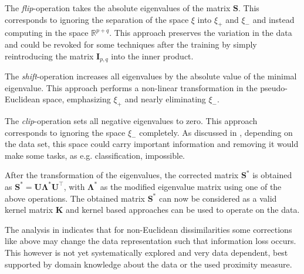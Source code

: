\documentclass[twoside,11pt]{article}
\begin{document}
The \emph{flip}-operation takes the absolute eigenvalues of the matrix $\mathbf{S}$.
This corresponds to ignoring the separation of the space $\xi$
into $\xi_+$ and $\xi_-$ and instead computing in the space $\mathbb{R}^{p+q}$.
This approach preserves the variation in the data
and could be revoked for some techniques after the training
by simply reintroducing the matrix $\mathbf{I}_{p,q}$ into the inner product.

The \emph{shift}-operation increases all eigenvalues by the absolute
value of the minimal eigenvalue.
This approach performs a non-linear transformation in the pseudo-Euclidean space,
emphasizing $\xi_+$ and nearly eliminating $\xi_-$.

The \emph{clip}-operation sets all negative eigenvalues to zero.
This approach corresponds to ignoring the space $\xi_-$ completely.
As discussed in \cite{DBLP:conf/sspr/PekalskaDGB04}, depending on the data set,
this space could carry important information
and removing it would make some tasks, as e.g. classification, impossible.

After the transformation of the eigenvalues,
the corrected matrix $\mathbf{S}^*$ is obtained as
$\mathbf{S}^* = \mathbf{U} \mathbf{\Lambda}^* \mathbf{U}^\top$,
with $\mathbf{\Lambda}^*$ as
the modified eigenvalue matrix using one of the above operations.
The obtained matrix $\mathbf{S}^*$ can now be considered
as a valid kernel matrix $\mathbf{K}$
and kernel based approaches can be used to operate on the data.

The analysis in \cite{DBLP:conf/sspr/PekalskaDGB04} indicates that for non-Euclidean dissimilarities some corrections like above 
may change the data representation such that information loss occurs.
This however is not yet systematically explored and very data dependent,
best supported by domain knowledge about the data or the used proximity measure.
\end{document}
